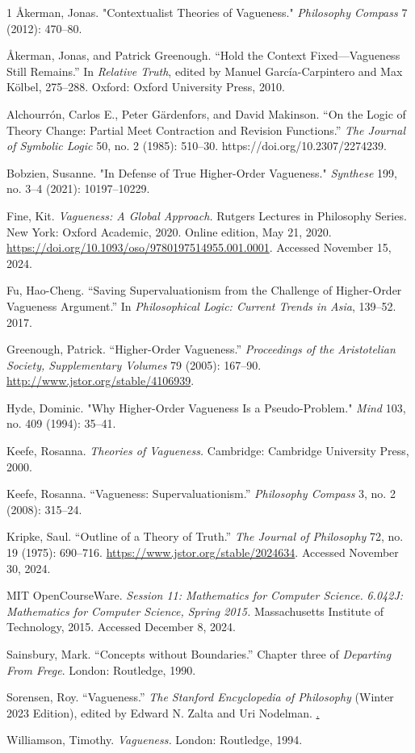 
  
\begin{hangparas}{\hangingindent}{1}
Åkerman, Jonas. "Contextualist Theories of Vagueness." \emph{Philosophy
Compass} 7 (2012): 470--80.

Åkerman, Jonas, and Patrick Greenough. ``Hold the Context
Fixed---Vagueness Still Remains.'' In \emph{Relative Truth}, edited by
Manuel García-Carpintero and Max Kölbel, 275--288. Oxford: Oxford
University Press, 2010.

Alchourrón, Carlos E., Peter Gärdenfors, and David Makinson. ``On the
Logic of Theory Change: Partial Meet Contraction and Revision
Functions.'' \emph{The Journal of Symbolic Logic} 50, no. 2 (1985):
510--30. https://doi.org/10.2307/2274239.

Bobzien, Susanne. "In Defense of True Higher-Order Vagueness."
\emph{Synthese} 199, no. 3--4 (2021): 10197--10229.

Fine, Kit. \emph{Vagueness: A Global Approach.} Rutgers Lectures in
Philosophy Series. New York: Oxford Academic, 2020. Online edition, May
21, 2020. \url{https://doi.org/10.1093/oso/9780197514955.001.0001}.
Accessed November 15, 2024.

Fu, Hao-Cheng. ``Saving Supervaluationism from the Challenge of
Higher-Order Vagueness Argument.'' In \emph{Philosophical Logic: Current
Trends in Asia}, 139--52. 2017.

Greenough, Patrick. ``Higher-Order Vagueness.'' \emph{Proceedings of the
Aristotelian Society, Supplementary Volumes} 79 (2005): 167--90.
\url{http://www.jstor.org/stable/4106939}.

Hyde, Dominic. "Why Higher-Order Vagueness Is a Pseudo-Problem."
\emph{Mind} 103, no. 409 (1994): 35--41.

Keefe, Rosanna. \emph{Theories of Vagueness.} Cambridge: Cambridge
University Press, 2000.

Keefe, Rosanna. ``Vagueness: Supervaluationism.'' \emph{Philosophy
Compass} 3, no. 2 (2008): 315--24.

Kripke, Saul. ``Outline of a Theory of Truth.'' \emph{The Journal of
Philosophy} 72, no. 19 (1975): 690--716.
\url{https://www.jstor.org/stable/2024634}. Accessed November 30, 2024.

MIT OpenCourseWare. \emph{Session 11: Mathematics for Computer Science.}
\emph{6.042J: Mathematics for Computer Science, Spring 2015.}
Massachusetts Institute of Technology, 2015. Accessed December 8, 2024.

Sainsbury, Mark. ``Concepts without Boundaries.'' Chapter three of
\emph{Departing From Frege}. London: Routledge, 1990.

Sorensen, Roy. ``Vagueness.'' \emph{The Stanford Encyclopedia of
Philosophy} (Winter 2023 Edition), edited by Edward N. Zalta and Uri
Nodelman.
\href{https://plato.stanford.edu/archives/win2023/entries/vagueness/}.

Williamson, Timothy. \emph{Vagueness.} London: Routledge, 1994.
\end{hangparas}
